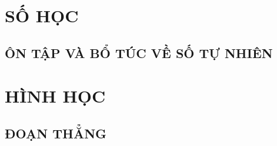 \documentclass[12pt,a5paper,twoside]{book}
\theoremstyle{explain}
\theoremstyle{nonumberplain}
\begin{document}
		\thispagestyle{empty}
		
		\begingroup
		\makeatletter
		\pagestyle{empty}
		\let\ps@fancy\ps@empty
		\tableofcontents
		\clearpage
		\cleardoublepage
		\endgroup
	\part{SỐ HỌC}
	\setcounter{chapter}{0}
	\chapter{ÔN TẬP VÀ BỔ TÚC VỀ SỐ TỰ NHIÊN}
		
		
		
		
		
		
		
		
		
		
		
		
		
		
		
		
	\part{HÌNH HỌC}
	\setcounter{chapter}{0}
	\chapter{ĐOẠN THẲNG}
		
		
		
		
		
		
		
		
%		
\end{document}
